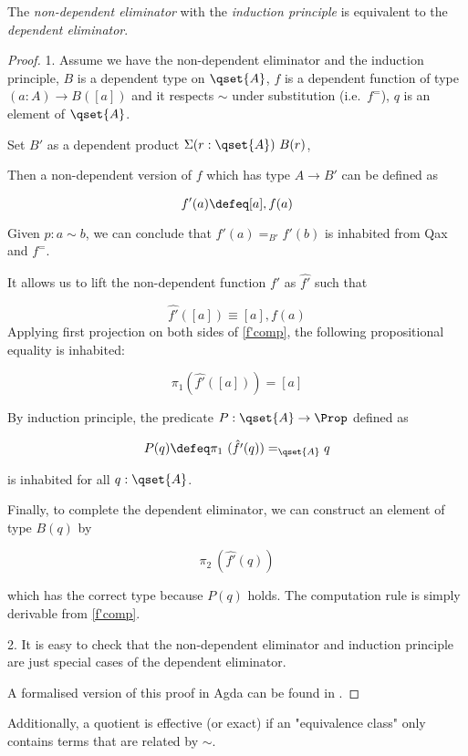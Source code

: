 \begin{proposition}\label{elim-equiv}
The \emph{non-dependent eliminator} with the \emph{induction principle} is equivalent to the \emph{dependent eliminator}.
\end{proposition}
\begin{proof}
1. Assume we have the non-dependent eliminator and the induction principle, $B$ is a dependent type on $\qset{A}$, $f$ is a dependent function of type $(a : A) \to B([ a ])$ and it respects $\sim$ under substitution (i.e.\ $f^=$), $q$ is an element of $\qset{A}$.

Set $B'$ as a dependent product $\Sigma (r : \qset{A}) ~B(r)$,

Then a non-dependent version of $f$ which has type $A \to B'$ can be defined as

$$f' (a) \defeq [ a ] , f (a)$$

Given $p : a \sim b$, we can conclude that $f'(a) =_{B'} f'(b)$ is inhabited from Qax and $f^=$.

It allows us to lift the non-dependent function $f'$ as $\hat{f'}$ such that 

\begin{equation}\label{f'comp}
\hat{f'} ([ a ]) \equiv [ a ] , f (a)
\end{equation}
Applying first projection on both sides of \ref{f'comp}, the following propositional equality is inhabited:

 $$\pi_1 (\hat{f'}([ a ])) = [ a ]$$

By induction principle, the predicate $P : \qset{A} \to \Prop$ defined as

$$P(q) \defeq \pi_1 ~(\hat{f'}(q)) =_{\qset{A}} q$$

is inhabited for all $q : \qset{A}$.

Finally, to complete the dependent eliminator, we can construct an element of type $B(q)$ by

$$\pi_2 ~(\hat{f'}(q))$$

which has the correct type because $P(q)$ holds. The computation rule is simply derivable from \ref{f'comp}.

2. It is easy to check that the non-dependent eliminator and induction principle are just special cases of the dependent eliminator.

A formalised version of this proof in Agda can be found in .
\end{proof}


Additionally, a quotient is effective (or exact) if an "equivalence class" only contains terms that are related by $\sim$.

